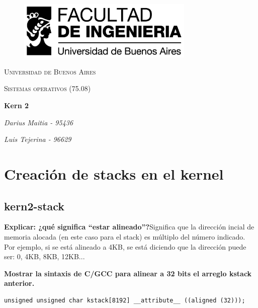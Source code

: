 \documentclass[a4paper]{article}
\author{You}
\begin{document}
\begin{figure}
 \centering
   \includegraphics[width=0.75\textwidth]{fiuba.jpg}
\end{figure}

\begin{titlepage}
		\centering
		{\scshape\LARGE Universidad de Buenos Aires \par}
		\vspace{1cm}
		{\scshape\Large Sistemas operativos (75.08)\par}
		\vspace{1.5cm}
		{\huge\bfseries Kern 2\par}
		\vspace{0.5cm}
		{\Large\itshape Darius Maitia - 95436 \par}
        \vspace{0.5cm}
        {\Large\itshape Luis Tejerina - 96629 \par}
        \vspace{0.5cm}
    {\Large\itshape \par}
    \vspace{1cm}  
\end{titlepage}

\tableofcontents
\newpage

\section{Creación de stacks en el kernel}
\subsection{kern2-stack}
\textbf{Explicar: ¿qué significa “estar alineado”?}\newline \newline Significa que la dirección incial de memoria alocada (en este caso para el stack) es múltiplo del número indicado. Por ejemplo, si se está alineado a 4KB, se está diciendo que la dirección puede ser: 0, 4KB, 8KB, 12KB...\newline 

\textbf{Mostrar la sintaxis de C/GCC para alinear a 32 bits el arreglo kstack anterior.}\newline 
\begin{lstlisting}
unsigned unsigned char kstack[8192] __attribute__ ((aligned (32)));
\end{lstlisting}
\end{document}
